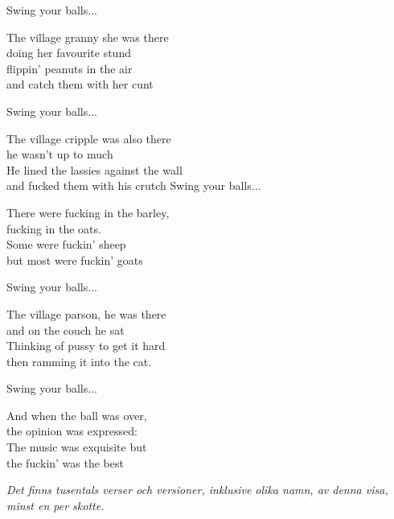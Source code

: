 \vspace{10pt}
Swing your balls...\par
\vspace{10pt}
The village granny she was there\\
doing her favourite stund\\
flippin' peanuts in the air\\
and catch them with her cunt\par
\vspace{10pt}
Swing your balls...\par
\vspace{10pt}
The village cripple was also there\\
he wasn't up to much\\
He lined the lassies against the wall\\
and fucked them with his crutch
\newpage
Swing your balls...\par
\vspace{7pt}
There were fucking in the barley,\\
fucking in the oats.\\
Some were fuckin' sheep\\
but most were fuckin' goats\par
\vspace{7pt}
Swing your balls...\par
\vspace{7pt}
The village parson, he was there\\
and on the couch he sat\\
Thinking of pussy to get it hard\\
then ramming it into the cat.\par
\vspace{7pt}
Swing your balls...\par
\vspace{7pt}
And when the ball was over,\\
the opinion was expressed:\\
The music was exquisite but\\
the fuckin' was the best
\par
\vspace{10pt}
{\footnotesize\textit{Det finns tusentals verser och versioner, inklusive olika namn, av denna visa, minst en per skotte.}}

